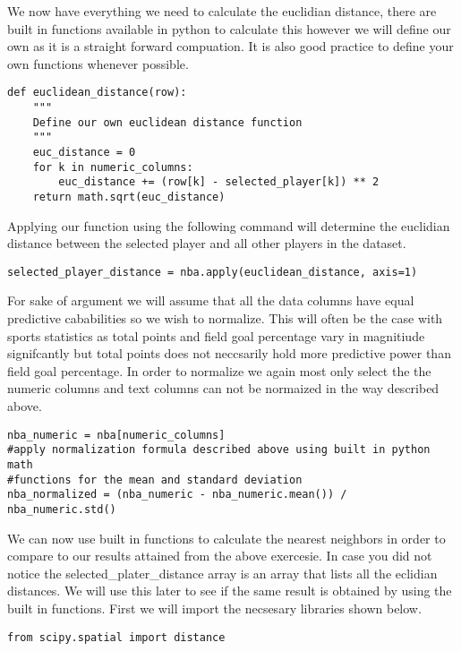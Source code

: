 We now have everything we need to calculate the euclidian distance,
there are built in functions available in python to calculate this
however we will define our own as it is a straight forward
compuation. It is also good practice to define your own functions
whenever possible. 

\begin{lstlisting}
def euclidean_distance(row):
    """
    Define our own euclidean distance function
    """
    euc_distance = 0
    for k in numeric_columns:
        euc_distance += (row[k] - selected_player[k]) ** 2
    return math.sqrt(euc_distance)
\end{lstlisting} 

Applying our function using the following command will determine the
euclidian distance between the selected player and all other players
in the dataset. 

\begin{lstlisting}
selected_player_distance = nba.apply(euclidean_distance, axis=1)
\end{lstlisting} 

For sake of argument we will assume that all the data columns have
equal predictive cababilities so we wish to normalize. This will often
be the case with sports statistics as total points and field goal
percentage vary in magnitiude signifcantly but total points does not
neccsarily hold more predictive power than field goal percentage. In
order to normalize we again most only select the the numeric columns
and text columns can not be normaized in the way described above. 


\begin{lstlisting}
nba_numeric = nba[numeric_columns]
#apply normalization formula described above using built in python math
#functions for the mean and standard deviation
nba_normalized = (nba_numeric - nba_numeric.mean()) / nba_numeric.std()
\end{lstlisting} 

We can now use built in functions to calculate the nearest
neighbors in order to compare to our results attained from the above
exercesie. In case you did not notice the selected\_plater\_distance
array is an array that lists all the eclidian distances. We will use
this later to see if the same result is obtained by using the built in
functions. First we will import the necsesary libraries shown below. 

 \begin{lstlisting}
from scipy.spatial import distance
\end{lstlisting} 

